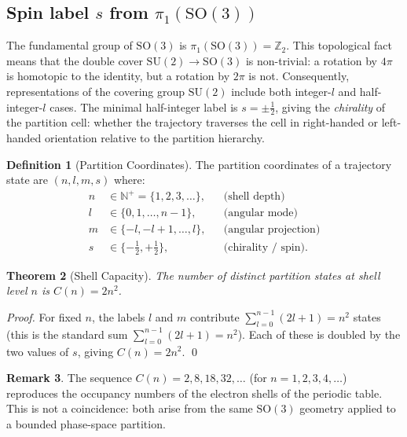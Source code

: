 \documentclass[11pt,twocolumn,a4paper]{article}
\theoremstyle{plain}
\newtheorem{theorem}{Theorem}[section]
\theoremstyle{definition}
\newtheorem{definition}[theorem]{Definition}
\newtheorem{remark}[theorem]{Remark}
\theoremstyle{remark}
\newcommand{\N}{\mathbb{N}}
\newcommand{\Z}{\mathbb{Z}}
\newcommand{\half}{\tfrac{1}{2}}
\begin{document}
\subsection{Spin label $s$ from $\pi_1(\mathrm{SO}(3))$}

The fundamental group of $\mathrm{SO}(3)$ is $\pi_1(\mathrm{SO}(3))=\Z_2$. This topological fact means that the double cover $\mathrm{SU}(2)\to\mathrm{SO}(3)$ is non-trivial: a rotation by $4\pi$ is homotopic to the identity, but a rotation by $2\pi$ is not. Consequently, representations of the covering group $\mathrm{SU}(2)$ include both integer-$l$ and half-integer-$l$ cases. The minimal half-integer label is $s=\pm\half$, giving the \emph{chirality} of the partition cell: whether the trajectory traverses the cell in right-handed or left-handed orientation relative to the partition hierarchy.

\begin{definition}[Partition Coordinates]
\label{def:partition-coords}
The partition coordinates of a trajectory state are $(n,l,m,s)$ where:
\begin{align*}
  n &\in \N^+ = \{1,2,3,\ldots\}, && \text{(shell depth)}\\
  l &\in \{0,1,\ldots,n-1\}, && \text{(angular mode)}\\
  m &\in \{-l,-l+1,\ldots,l\}, && \text{(angular projection)}\\
  s &\in \{-\half,+\half\}, && \text{(chirality / spin)}.
\end{align*}
\end{definition}

\begin{theorem}[Shell Capacity]
\label{thm:shell-capacity}
The number of distinct partition states at shell level $n$ is $C(n)=2n^2$.
\end{theorem}

\begin{proof}
For fixed $n$, the labels $l$ and $m$ contribute $\sum_{l=0}^{n-1}(2l+1)=n^2$ states (this is the standard sum $\sum_{l=0}^{n-1}(2l+1)=n^2$). Each of these is doubled by the two values of $s$, giving $C(n)=2n^2$. \qed
\end{proof}

\begin{remark}
The sequence $C(n)=2,8,18,32,\ldots$ (for $n=1,2,3,4,\ldots$) reproduces the occupancy numbers of the electron shells of the periodic table. This is not a coincidence: both arise from the same $\mathrm{SO}(3)$ geometry applied to a bounded phase-space partition.
\end{remark}
\end{document}
